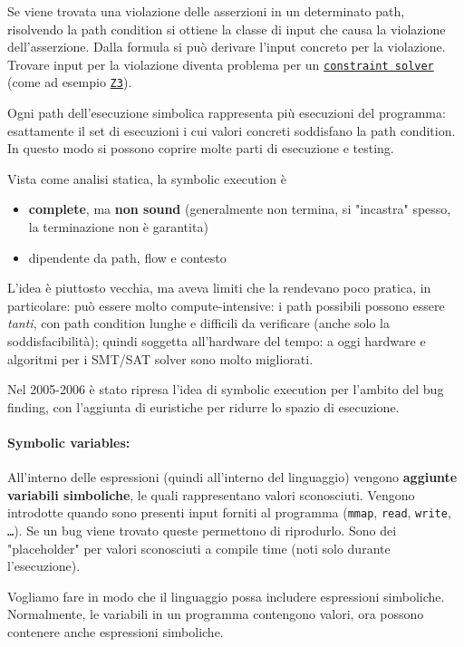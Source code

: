 Se viene trovata una violazione delle asserzioni in un determinato path, risolvendo la path condition si ottiene la classe di input che causa la violazione dell'asserzione. Dalla formula si può derivare l'input concreto per la violazione. Trovare input per la violazione diventa problema per un \href{https://en.wikipedia.org/wiki/Constraint_programming}{\texttt{constraint solver}} (come ad esempio \href{https://github.com/z3prover/z3}{\texttt{Z3}}).

Ogni path dell'esecuzione simbolica rappresenta più esecuzioni del programma: esattamente il set di esecuzioni i cui valori concreti soddisfano la path condition. In questo modo si possono coprire molte parti di esecuzione e testing.

Vista come analisi statica, la symbolic execution è
\begin{itemize}
	\item \textbf{complete}, ma \textbf{non sound} (generalmente non termina, si "incastra" spesso, la terminazione non è garantita)
    
	\item dipendente da path, flow e contesto
\end{itemize}

L'idea è piuttosto vecchia, ma aveva limiti che la rendevano poco pratica, in particolare: può essere molto compute-intensive: i path possibili possono essere \textit{tanti}, con path condition lunghe e difficili da verificare (anche solo la soddisfacibilità); quindi soggetta all'hardware del tempo: a oggi hardware e algoritmi per i SMT/SAT solver sono molto migliorati.

Nel 2005-2006 è stato ripresa l'idea di symbolic execution per l'ambito del bug finding, con l'aggiunta di euristiche per ridurre lo spazio di esecuzione.

\paragraph{Symbolic variables:} All'interno delle espressioni (quindi all'interno del linguaggio) vengono \textbf{aggiunte variabili simboliche}, le quali rappresentano valori sconosciuti. Vengono introdotte quando sono presenti input forniti al programma (\texttt{mmap}, \texttt{read}, \texttt{write}, \texttt{\dots}). Se un bug viene trovato queste permettono di riprodurlo. Sono dei "placeholder" per valori sconosciuti a compile time (noti solo durante l'esecuzione).

Vogliamo fare in modo che il linguaggio possa includere espressioni simboliche. Normalmente, le variabili in un programma contengono valori, ora possono contenere anche espressioni simboliche. 

